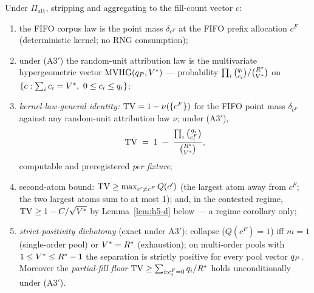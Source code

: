 
\begin{lemma}
\label{lem:h5-c}
Under $\Pi_{\mathrm{att}}$, stripping  and aggregating
to the fill-count vector $c$:
\begin{enumerate}
\item[(i)] the FIFO corpus law is the point mass $\delta_{c^{F}}$ at the
FIFO prefix allocation $c^{F}$ (deterministic kernel; no RNG consumption);
\item[(ii)] under (A3$'$) the random-unit attribution law is the
multivariate hypergeometric vector $\operatorname{MVHG}(q_{P}, V^{*})$ --- probability
$\prod_i \binom{q_i}{c_i} / \binom{R^{*}}{V^{*}}$ on
$\{c : \sum_i c_i = V^{*},\ 0 \le c_i \le q_i\}$;
\item[(iii)] \emph{kernel-law-general identity:}
$\operatorname{TV} = 1 - \nu(\{c^{F}\})$ for the FIFO point mass $\delta_{c^F}$ against
any random-unit attribution law $\nu$; under (A3$'$),
\[
\operatorname{TV} \;=\; 1 \;-\; \frac{\prod_i \binom{q_i}{c_i^{F}}}{\binom{R^{*}}{V^{*}}},
\]
computable and preregistered \emph{per fixture};
\item[(iv)] second-atom bound: $\operatorname{TV} \ge \max_{c' \ne c^{F}} Q(c')$ (the
largest atom away from $c^{F}$; the two largest atoms sum to at most 1);
and, in the contested regime, $\operatorname{TV} \ge 1 - C/\sqrt{V^{*}}$ by
Lemma~\ref{lem:h5-d} below --- a regime corollary only;
\item[(v)] \emph{strict-positivity dichotomy} (exact under A3$'$): collapse
($Q(c^{F}) = 1$) iff $m = 1$ (single-order pool) or $V^{*} = R^{*}$
(exhaustion); on multi-order pools with $1 \le V^{*} \le R^{*} - 1$ the
separation is strictly positive for every pool vector $q_{P}$. Moreover the
\emph{partial-fill floor} $\operatorname{TV} \ge \sum_{i : c_i^{F} = 0} q_i / R^{*}$
holds unconditionally under (A3$'$).
\end{enumerate}
\end{lemma}


